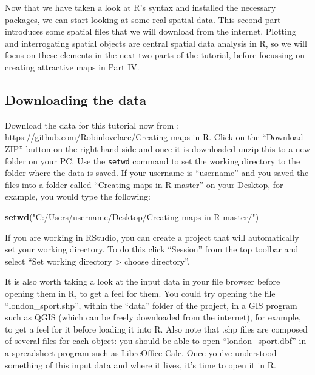\documentclass[]{article}
\newenvironment{Shaded}{}{}
\newcommand{\KeywordTok}[1]{\textcolor[rgb]{0.00,0.44,0.13}{\textbf{{#1}}}}
\newcommand{\StringTok}[1]{\textcolor[rgb]{0.25,0.44,0.63}{{#1}}}
\newcommand{\NormalTok}[1]{{#1}}
\begin{document}
Now that we have taken a look at R's syntax and installed the necessary
packages, we can start looking at some real spatial data. This second
part introduces some spatial files that we will download from the
internet. Plotting and interrogating spatial objects are central spatial
data analysis in R, so we will focus on these elements in the next two
parts of the tutorial, before focussing on creating attractive maps in
Part IV.

\subsection{Downloading the data}\label{downloading-the-data}

Download the data for this tutorial now from :
\href{https://github.com/Robinlovelace/Creating-maps-in-R}{\url{https://github.com/Robinlovelace/Creating-maps-in-R}}.
Click on the ``Download ZIP'' button on the right hand side and once it
is downloaded unzip this to a new folder on your PC. Use the
\texttt{setwd} command to set the working directory to the folder where
the data is saved. If your username is ``username'' and you saved the
files into a folder called ``Creating-maps-in-R-master'' on your
Desktop, for example, you would type the following:

\begin{Shaded}
\begin{Highlighting}[]
\KeywordTok{setwd}\NormalTok{(}\StringTok{"C:/Users/username/Desktop/Creating-maps-in-R-master/"}\NormalTok{)}
\end{Highlighting}
\end{Shaded}

If you are working in RStudio, you can create a project that will
automatically set your working directory. To do this click ``Session''
from the top toolbar and select ``Set working directory \textgreater{}
choose directory''.

It is also worth taking a look at the input data in your file browser
before opening them in R, to get a feel for them. You could try opening
the file ``london\_sport.shp'', within the ``data'' folder of the
project, in a GIS program such as QGIS (which can be freely downloaded
from the internet), for example, to get a feel for it before loading it
into R. Also note that .shp files are composed of several files for each
object: you should be able to open ``london\_sport.dbf'' in a
spreadsheet program such as LibreOffice Calc. Once you've understood
something of this input data and where it lives, it's time to open it in
R.
\end{document}
